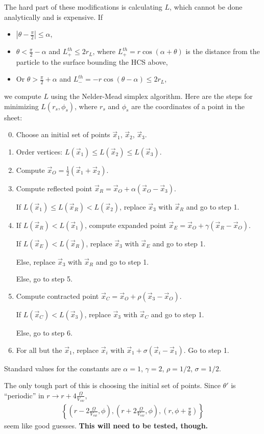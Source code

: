 \documentclass[11pt]{article}
\begin{document}
The hard part of these modifications is calculating $L$, which cannot be done analytically and is expensive.  If
\begin{itemize}
    \item
        $|\theta - \frac{\pi}{2}| \leq \alpha$,
    \item
        $\theta < \frac{\pi}{2} - \alpha$ and $L_+^{th} \leq 2 r_L$, where $L_+^{th} = r \cos(\alpha + \theta)$ is the distance from the particle to the surface bounding the HCS above,
    \item
        Or $\theta > \frac{\pi}{2} + \alpha$ and $L_-^{th} = - r \cos(\theta - \alpha) \leq 2 r_L$,
\end{itemize}
we compute $L$ using the Nelder-Mead simplex algorithm.  Here are the steps for minimizing $L(r_s, \phi_s)$, where $r_s$ and $\phi_s$ are the coordinates of a point in the sheet:
\begin{enumerate}
    \setcounter{enumi}{-1}
    \item
        Choose an initial set of points $\vec{x}_1$, $\vec{x}_2$, $\vec{x}_3$.
    \item
        Order vertices: $L(\vec{x}_1) \leq L(\vec{x}_2) \leq L(\vec{x}_3)$.
    \item
        Compute $\vec{x}_O = \frac{1}{2} (\vec{x}_1 + \vec{x}_2)$.
    \item
        Compute reflected point $\vec{x}_R = \vec{x}_O + \alpha (\vec{x}_O - \vec{x}_3)$.
        
        If $L(\vec{x}_1) \leq L(\vec{x}_R) < L(\vec{x}_2)$, replace $\vec{x}_3$ with $\vec{x}_R$ and go to step 1.
    \item
        If $L(\vec{x}_R) < L(\vec{x}_1)$, compute expanded point $\vec{x}_E = \vec{x}_O + \gamma (\vec{x}_R - \vec{x}_O)$.  

        \quad If $L(\vec{x}_E) < L(\vec{x}_R)$, replace $\vec{x}_3$ with $\vec{x}_E$ and go to step 1.

        \quad Else, replace $\vec{x}_3$ with $\vec{x}_R$ and go to step 1.

        Else, go to step 5.
    \item
        Compute contracted point $\vec{x}_C = \vec{x}_O + \rho (\vec{x}_3 - \vec{x}_O)$.

        If $L(\vec{x}_C) < L(\vec{x}_3)$, replace $\vec{x}_3$ with $\vec{x}_C$ and go to step 1.

        Else, go to step 6.
    \item
        For all but the $\vec{x}_1$, replace $\vec{x}_i$ with $\vec{x}_1 + \sigma (\vec{x}_i - \vec{x}_1)$.  Go to step 1.
\end{enumerate}
Standard values for the constants are $\alpha = 1$, $\gamma = 2$, $\rho = 1/2$, $\sigma = 1/2$.  

The only tough part of this is choosing the initial set of points.  Since $\theta'$ is ``periodic'' in $r \to r + 4 \frac{\Omega}{V_{sw}}$,
\begin{align*}
    \left\{ \left( r - 2 \frac{\Omega}{V_{sw}}, \phi \right), \left( r + 2 \frac{\Omega}{V_{sw}}, \phi \right), \left( r, \phi + \frac{\pi}{6} \right) \right\}
\end{align*}
seem like good guesses.  \textbf{This will need to be tested, though.}
\end{document}
